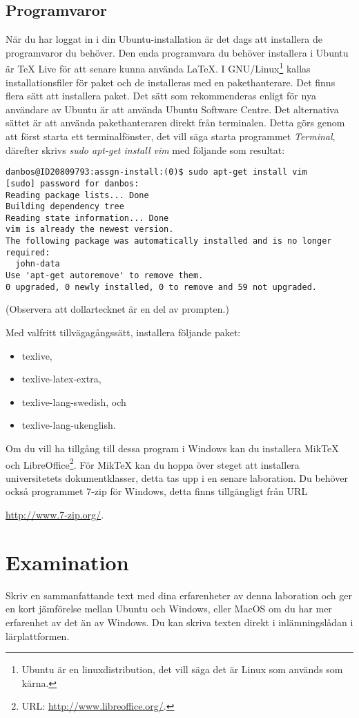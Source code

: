 \documentclass[11pt,a4paper]{miunasgn}
\begin{document}
\subsection{Programvaror}
\noindent
När du har loggat in i din Ubuntu-installation är det dags att installera de 
programvaror du behöver.
Den enda programvara du behöver installera i Ubuntu är TeX Live för att senare 
kunna använda \LaTeX.
I GNU/Linux\footnote{%
	Ubuntu är en linuxdistribution, det vill säga det är Linux som används som 
	kärna.
} kallas installationsfiler för paket och de installeras med en pakethanterare.
Det finns flera sätt att installera paket.
Det sätt som rekommenderas enligt \citet{UbuntuDesktop} för nya användare av 
Ubuntu är att använda Ubuntu Software Centre.
Det alternativa sättet är att använda pakethanteraren direkt från terminalen.
Detta görs genom att först starta ett terminalfönster, det vill säga starta 
programmet \emph{Terminal}, därefter skrivs \emph{sudo apt-get install vim} med 
följande som resultat:
\begin{lstlisting}
danbos@ID20809793:assgn-install:(0)$ sudo apt-get install vim
[sudo] password for danbos: 
Reading package lists... Done
Building dependency tree       
Reading state information... Done
vim is already the newest version.
The following package was automatically installed and is no longer required:
  john-data
Use 'apt-get autoremove' to remove them.
0 upgraded, 0 newly installed, 0 to remove and 59 not upgraded.
\end{lstlisting}
(Observera att dollartecknet är en del av prompten.)

Med valfritt tillvägagångssätt, installera följande paket:
\begin{itemize}
	\item texlive,
	\item texlive-latex-extra,
	\item texlive-lang-swedish, och
	\item texlive-lang-ukenglish.
\end{itemize}

Om du vill ha tillgång till dessa program i Windows kan du installera MikTeX 
\citep{Bosk2012lui} och LibreOffice\footnote{%
	URL: \url{http://www.libreoffice.org/}.
}.
För MikTeX kan du hoppa över steget att installera universitetets 
dokumentklasser, detta tas upp i en senare laboration.
Du behöver också programmet 7-zip för Windows, detta finns tillgängligt från 
URL
\begin{center}
	\url{http://www.7-zip.org/}.
\end{center}


\section{Examination}
\label{sec:Examination}
\noindent
Skriv en sammanfattande text med dina erfarenheter av denna laboration och ger 
en kort jämförelse mellan Ubuntu och Windows, eller MacOS om du har mer 
erfarenhet av det än av Windows.
Du kan skriva texten direkt i inlämningslådan i lärplattformen.



\end{document}
